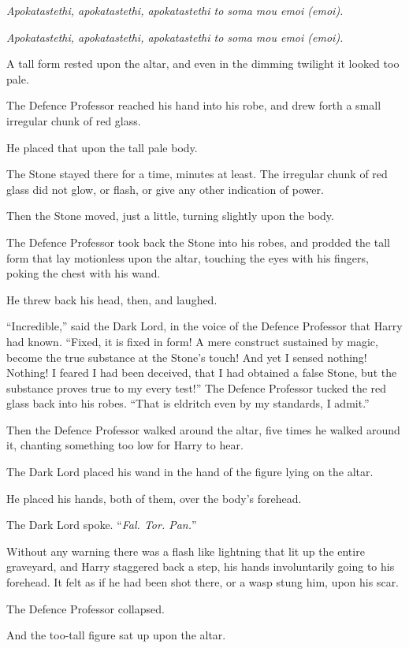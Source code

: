 \emph{Apokatastethi, apokatastethi, apokatastethi to soma mou emoi (emoi).}

\emph{Apokatastethi, apokatastethi, apokatastethi to soma mou emoi (emoi).}

A tall form rested upon the altar, and even in the dimming twilight it looked too pale.

The Defence Professor reached his hand into his robe, and drew forth a small irregular chunk of red glass.

He placed that upon the tall pale body.

The Stone stayed there for a time, minutes at least. The irregular chunk of red glass did not glow, or flash, or give any other indication of power.

Then the Stone moved, just a little, turning slightly upon the body.

The Defence Professor took back the Stone into his robes, and prodded the tall form that lay motionless upon the altar, touching the eyes with his fingers, poking the chest with his wand.

He threw back his head, then, and laughed.

“Incredible,” said the Dark Lord, in the voice of the Defence Professor that Harry had known. “Fixed, it is fixed in form! A mere construct sustained by magic, become the true substance at the Stone’s touch! And yet I sensed nothing! Nothing! I feared I had been deceived, that I had obtained a false Stone, but the substance proves true to my every test!” The Defence Professor tucked the red glass back into his robes. “That is eldritch even by my standards, I admit.”

Then the Defence Professor walked around the altar, five times he walked around it, chanting something too low for Harry to hear.

The Dark Lord placed his wand in the hand of the figure lying on the altar.

He placed his hands, both of them, over the body’s forehead.

The Dark Lord spoke. “\emph{Fal. Tor. Pan.}”

Without any warning there was a flash like lightning that lit up the entire graveyard, and Harry staggered back a step, his hands involuntarily going to his forehead. It felt as if he had been shot there, or a wasp stung him, upon his scar.

The Defence Professor collapsed.

And the too-tall figure sat up upon the altar.

